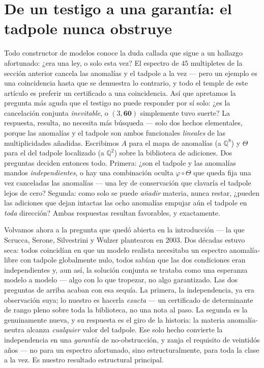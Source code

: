 \documentclass[11pt,a4paper]{article}
\begin{document}
\section{De un testigo a una garant\'ia: el tadpole nunca obstruye}\label{sec:existence}
Todo constructor de modelos conoce la duda callada que sigue a un hallazgo afortunado:
¿era una ley, o solo esta vez? El espectro de $45$ multipletes de la secci\'on anterior
cancela las anomal\'ias y el tadpole a la vez --- pero un ejemplo es una coincidencia
hasta que se demuestra lo contrario, y todo el temple de este art\'iculo es preferir un
certificado a una coincidencia. As\'i que apretamos la pregunta m\'as aguda que el testigo
no puede responder por s\'i solo: ¿es la cancelaci\'on conjunta \emph{inevitable}, o
$(3,\mathbf{60})$ simplemente tuvo suerte? La respuesta, resulta, no necesita m\'as
b\'usqueda --- solo dos hechos elementales, porque las anomal\'ias y el tadpole son ambos
funcionales \emph{lineales} de las multiplicidades a\~nadidas. Escribimos $A$ para el mapa
de anomal\'ias (a $\mathbb{Q}^8$) y $\Theta$ para el del tadpole localizado (a
$\mathbb{Q}^2$) sobre la biblioteca de adiciones. Dos preguntas deciden entonces todo.
Primera: ¿son el tadpole y las anomal\'ias mandos \emph{independientes}, o hay una
combinaci\'on oculta $\varphi\circ\Theta$ que queda fija una vez canceladas las
anomal\'ias --- una ley de conservaci\'on que clavar\'ia el tadpole lejos de cero?
Segunda: como solo se puede \emph{a\~nadir} materia, nunca restar, ¿pueden las adiciones
que dejan intactas las ocho anomal\'ias empujar a\'un el tadpole en \emph{toda}
direcci\'on? Ambas respuestas resultan favorables, y exactamente.

Volvamos ahora a la pregunta que qued\'o abierta en la introducci\'on --- la que Scrucca,
Serone, Silvestrini y Wulzer plantearon en 2003. Dos d\'ecadas estuvo seca: todos coincid\'ian
en que un modelo realista necesitaba un espectro anomal\'ia-libre con tadpole globalmente
nulo, todos sab\'ian que las dos condiciones eran independientes y, aun as\'i, la soluci\'on
conjunta se trataba como una esperanza modelo a modelo --- algo con lo que tropezar, no algo
garantizado. Las dos preguntas de arriba acaban con esa sequ\'ia. La primera, la
independencia, ya era observaci\'on suya; lo nuestro es hacerla \emph{exacta} --- un
certificado de determinante de rango pleno sobre toda la biblioteca, no una nota al paso. La
segunda es la genuinamente nueva, y su respuesta es el giro de la historia: la materia
anomal\'ia-neutra alcanza \emph{cualquier} valor del tadpole. Ese solo hecho convierte la
independencia en una \emph{garant\'ia} de no-obstrucci\'on, y zanja el requisito de veintid\'os
a\~nos --- no para un espectro afortunado, sino estructuralmente, para toda la clase a la vez.
Es nuestro resultado estructural principal.
\end{document}
